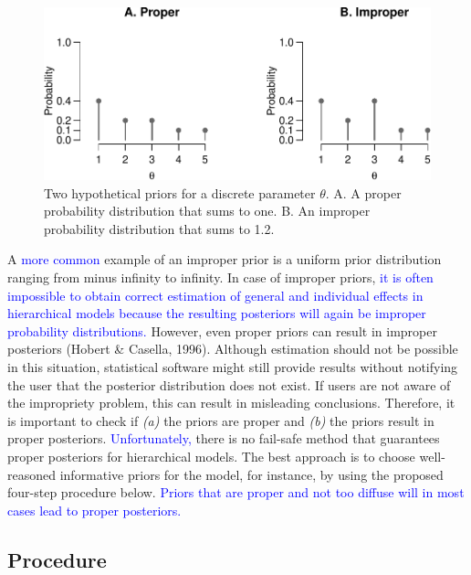 \documentclass[
  english,
  doc,floatsintext]{apa6}
\begin{document}
\begin{figure}[H]

{\centering \includegraphics{manuscript_files/figure-latex/properfigure-1} 

}

\caption{Two hypothetical priors for a discrete parameter $\theta$. A. A proper probability distribution that sums to one. B. An improper probability distribution that sums to 1.2.}\label{fig:properfigure}
\end{figure}

A \textcolor{blue}{more common} example of an improper prior is a uniform prior distribution ranging from minus infinity to infinity. In case of improper priors, \textcolor{blue}{it is often impossible to obtain correct estimation of general and individual effects in hierarchical models because the resulting posteriors will again be improper probability distributions.} However, even proper priors can result in improper posteriors (Hobert \& Casella, 1996). Although estimation should not be possible in this situation, statistical software might still provide results without notifying the user that the posterior distribution does not exist. If users are not aware of the impropriety problem, this can result in misleading conclusions. Therefore, it is important to check if \emph{(a)} the priors are proper and \emph{(b)} the priors result in proper posteriors. \textcolor{blue}{Unfortunately,} there is no fail-safe method that guarantees proper posteriors for hierarchical models. The best approach is to choose well-reasoned informative priors for the model, for instance, by using the proposed four-step procedure below. \textcolor{blue}{Priors that are proper and not too diffuse will in most cases lead to proper posteriors.}

\hypertarget{procedure}{%
\subsection{Procedure}\label{procedure}}
\end{document}
